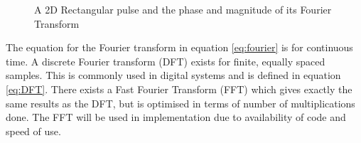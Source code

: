 \begin{figure}
\centering
{}
\caption{A 2D Rectangular pulse and the phase and magnitude of its Fourier Transform}
\label{fig:SquareWaveFT}
\end{figure}

The equation for the Fourier transform in equation \eqref{eq:fourier} is for continuous time. A discrete Fourier transform (DFT) exists for finite, equally spaced samples. This is commonly used in digital systems and is defined in equation \eqref{eq:DFT}. There exists a Fast Fourier Transform (FFT) which gives exactly the same results as the DFT, but is optimised in terms of number of multiplications done. The FFT will be used in implementation due to availability of code and speed of use. 

